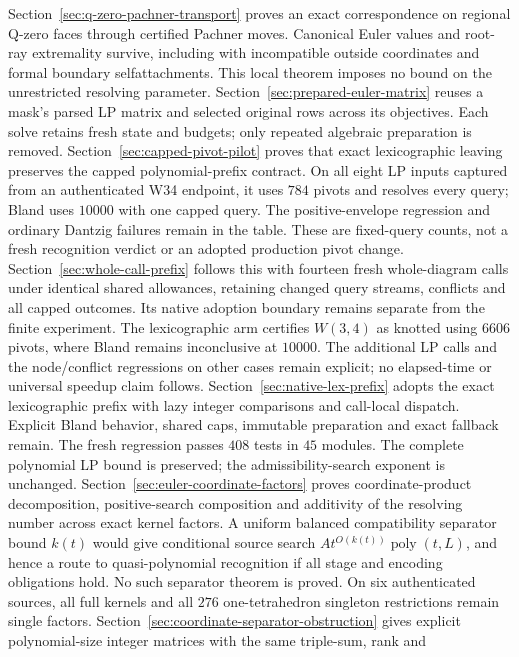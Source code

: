 \documentclass[11pt]{article}
\theoremstyle{remark}
\begin{document}
Section~\ref{sec:q-zero-pachner-transport} proves an exact correspondence
on regional Q-zero faces through certified Pachner moves.  Canonical
Euler values and root-ray extremality survive, including with incompatible
outside coordinates and formal boundary selfattachments.  This local
theorem imposes no bound on the unrestricted resolving parameter.
Section~\ref{sec:prepared-euler-matrix} reuses a mask's parsed LP matrix and
selected original rows across its objectives.  Each solve retains fresh
state and budgets; only repeated algebraic preparation is removed.
Section~\ref{sec:capped-pivot-pilot} proves that exact lexicographic leaving
preserves the capped polynomial-prefix contract.  On all eight LP inputs
captured from an authenticated W34 endpoint, it uses $784$ pivots and
resolves every query; Bland uses $10000$ with one capped query.  The
positive-envelope regression and ordinary Dantzig failures remain in the
table.  These are fixed-query counts, not a fresh recognition verdict or
an adopted production pivot change.
Section~\ref{sec:whole-call-prefix} follows this with fourteen fresh
whole-diagram calls under identical shared allowances, retaining changed
query streams, conflicts and all capped outcomes.  Its native adoption
boundary remains separate from the finite experiment.
The lexicographic arm certifies $W(3,4)$ as knotted using $6606$ pivots,
where Bland remains inconclusive at $10000$.  The additional LP calls
and the node/conflict regressions on other cases remain explicit; no
elapsed-time or universal speedup claim follows.
Section~\ref{sec:native-lex-prefix} adopts the exact lexicographic prefix
with lazy integer comparisons and call-local dispatch.  Explicit Bland
behavior, shared caps, immutable preparation and exact fallback remain.
The fresh regression passes $408$ tests in $45$ modules.  The complete
polynomial LP bound is preserved; the admissibility-search exponent is
unchanged.
Section~\ref{sec:euler-coordinate-factors} proves coordinate-product
decomposition, positive-search composition and additivity of the resolving
number across exact kernel factors.  A uniform balanced compatibility
separator bound $k(t)$ would give conditional source search
$A t^{O(k(t))}\operatorname{poly}(t,L)$, and hence a route to quasi-polynomial
recognition if all stage and encoding obligations hold.  No such separator
theorem is proved.  On six authenticated sources, all full kernels and all
$276$ one-tetrahedron singleton restrictions remain single factors.
Section~\ref{sec:coordinate-separator-obstruction} gives explicit
polynomial-size integer matrices with the same triple-sum, rank and
\end{document}

